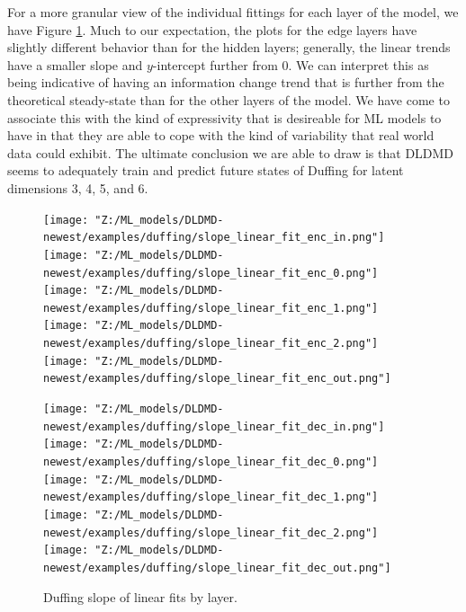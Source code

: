 For a more granular view of the individual fittings for each layer of the model, we have Figure
\ref{fig:duffing slopes all layers}. Much to our 
expectation, the plots for the edge layers have slightly different behavior than for the hidden layers;
generally, the linear trends have a smaller slope and $y$-intercept further from 0. We can interpret this 
as being indicative of having an information change trend that is further from the theoretical steady-state
than for the other layers of the model. We have come to associate this with the kind of expressivity that is
desireable for ML models to have in that they are able to cope with the kind of variability that real world 
data could exhibit. The ultimate conclusion we are able to draw is that DLDMD seems to adequately train and 
predict future states of Duffing for latent dimensions 3, 4, 5, and 6.

\begin{figure}[!htbp]
    \centering
    \begin{minipage}{.5\textwidth}
        \texttt{[image: "Z:/ML\_models/DLDMD-newest/examples/duffing/slope\_linear\_fit\_enc\_in.png"]} 
        \texttt{[image: "Z:/ML\_models/DLDMD-newest/examples/duffing/slope\_linear\_fit\_enc\_0.png"]} 
        \texttt{[image: "Z:/ML\_models/DLDMD-newest/examples/duffing/slope\_linear\_fit\_enc\_1.png"]} 
        \texttt{[image: "Z:/ML\_models/DLDMD-newest/examples/duffing/slope\_linear\_fit\_enc\_2.png"]} 
        \texttt{[image: "Z:/ML\_models/DLDMD-newest/examples/duffing/slope\_linear\_fit\_enc\_out.png"]} 
    \end{minipage}%
    \begin{minipage}{.5\textwidth}
        \texttt{[image: "Z:/ML\_models/DLDMD-newest/examples/duffing/slope\_linear\_fit\_dec\_in.png"]} 
        \texttt{[image: "Z:/ML\_models/DLDMD-newest/examples/duffing/slope\_linear\_fit\_dec\_0.png"]} 
        \texttt{[image: "Z:/ML\_models/DLDMD-newest/examples/duffing/slope\_linear\_fit\_dec\_1.png"]} 
        \texttt{[image: "Z:/ML\_models/DLDMD-newest/examples/duffing/slope\_linear\_fit\_dec\_2.png"]} 
        \texttt{[image: "Z:/ML\_models/DLDMD-newest/examples/duffing/slope\_linear\_fit\_dec\_out.png"]} 
    \end{minipage}
    \caption{Duffing slope of linear fits by layer.}
    \label{fig:duffing slopes all layers}
\end{figure}

